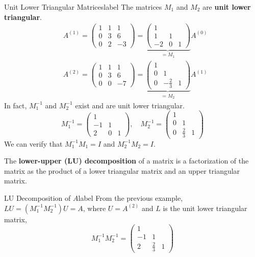 \begin{ex}{Unit Lower Triangular Matrices}{label}
	The matrices $M_1$ and $M_2$ are \textbf{unit lower triangular}.
	\[
	\begin{aligned}
	&A^{(1)}=\left(\begin{array}{ccc}
	1 & 1 & 1 \\
	0 & 3 & 6 \\
	0 & 2 & -3
	\end{array}\right)=\underbrace{\left(\begin{array}{ccc}
	1 & & \\
	1 & 1 & \\
	-2 & 0 & 1
	\end{array}\right)}_{=M_1} A^{(0)} \\
	&A^{(2)}=\left(\begin{array}{ccc}
	1 & 1 & 1 \\
	0 & 3 & 6 \\
	0 & 0 & -7
	\end{array}\right)=\underbrace{\left(\begin{array}{ccc}
	1 & & \\
	0 & 1 & \\
	0 & -\frac{2}{3} & 1
	\end{array}\right)}_{=M_2} A^{(1)}
	\end{aligned}
	\]
	In fact, $M_1^{-1}$ and $M_2^{-1}$ exist and are unit lower triangular.
	\[M_1^{-1}=\left(\begin{array}{ccc}
	1 & & \\
	-1 & 1 & \\
	2 & 0 & 1
	\end{array}\right), \quad M_2^{-1}=\left(\begin{array}{ccc}
	1 & & \\
	0 & 1 & \\
	0 & \frac{2}{3} & 1
	\end{array}\right)\]
	We can verify that $M_1^{-1} M_1=I$ and $M_2^{-1} M_2=I$.
\end{ex}

\begin{defn}[LU Decomposition]
	\sloppy The \textbf{lower-upper (LU) decomposition} of a matrix is a factorization of the matrix as the product of a lower triangular matrix and an upper triangular matrix.
\end{defn}

\begin{ex}{LU Decomposition of $A$}{label}
	From the previous example, $LU = (M_1^{-1} M_2^{-1}) U=A$, where $U = A^{(2)}$ and $L$ is the unit lower triangular matrix,
	\[M_1^{-1} M_2^{-1}=\left(\begin{array}{ccc}1 & & \\ -1 & 1 & \\ 2 & \frac{2}{3} & 1\end{array}\right)\]
\end{ex}

